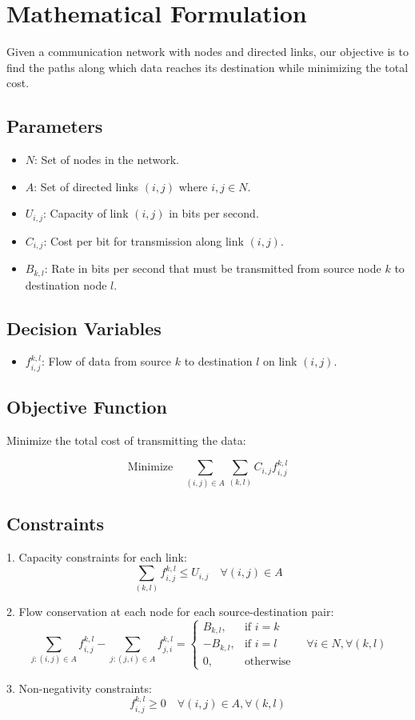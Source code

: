 \documentclass{article}
\begin{document}
\section*{Mathematical Formulation}

Given a communication network with nodes and directed links, our objective is to find the paths along which data reaches its destination while minimizing the total cost.

\subsection*{Parameters}
\begin{itemize}
    \item $N$: Set of nodes in the network.
    \item $A$: Set of directed links $(i,j)$ where $i, j \in N$.
    \item $U_{i,j}$: Capacity of link $(i,j)$ in bits per second.
    \item $C_{i,j}$: Cost per bit for transmission along link $(i,j)$.
    \item $B_{k,l}$: Rate in bits per second that must be transmitted from source node $k$ to destination node $l$.
\end{itemize}

\subsection*{Decision Variables}
\begin{itemize}
    \item $f_{i,j}^{k,l}$: Flow of data from source $k$ to destination $l$ on link $(i,j)$.
\end{itemize}

\subsection*{Objective Function}
Minimize the total cost of transmitting the data:

\[
\text{Minimize} \quad \sum_{(i,j) \in A} \sum_{(k,l)} C_{i,j} f_{i,j}^{k,l}
\]

\subsection*{Constraints}
1. Capacity constraints for each link:
   \[
   \sum_{(k,l)} f_{i,j}^{k,l} \leq U_{i,j} \quad \forall (i,j) \in A
   \]

2. Flow conservation at each node for each source-destination pair:
   \[
   \sum_{j:(i,j) \in A} f_{i,j}^{k,l} - \sum_{j:(j,i) \in A} f_{j,i}^{k,l} = 
   \begin{cases} 
   B_{k,l}, & \text{if } i = k\\
   -B_{k,l}, & \text{if } i = l\\
   0, & \text{otherwise}
   \end{cases}
   \quad \forall i \in N, \forall (k,l)
   \]

3. Non-negativity constraints:
   \[
   f_{i,j}^{k,l} \geq 0 \quad \forall (i,j) \in A, \forall (k,l)
   \]
\end{document}
